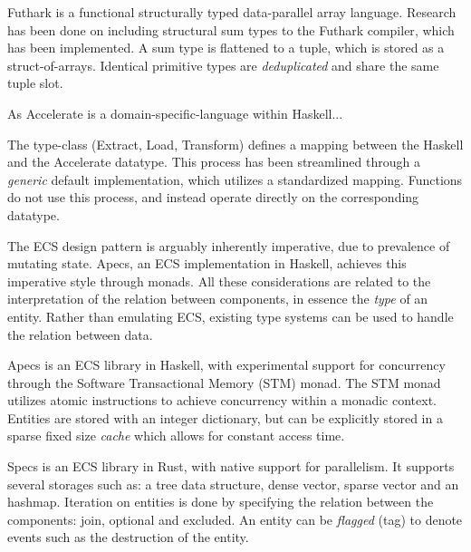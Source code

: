 \documentclass{article}
\newcommand{\type}[1]{\smash{\colorbox{codegray}{\texttt{#1}}}}
\begin{document}
Futhark is a functional structurally typed data-parallel array language.
Research has been done on including structural sum types to the Futhark compiler\cite{futhark-sum-types}, which has been implemented.
A sum type is flattened to a tuple, which is stored as a struct-of-arrays. 
Identical primitive types are {\it deduplicated} and share the same tuple slot.


As Accelerate is a domain-specific-language within Haskell...

The \type{Elt} type-class (Extract, Load, Transform) defines a mapping between the Haskell and the Accelerate datatype.
This process has been streamlined through a {\it generic} default implementation, which utilizes a standardized mapping.
Functions do not use this process, and instead operate directly on the corresponding datatype.

The ECS design pattern is arguably inherently imperative, due to prevalence of mutating state. 
Apecs, an ECS implementation in Haskell, achieves this imperative style through monads\cite{ecs-apecs}.
All these considerations are related to the interpretation of the relation between components, in essence the {\it type} of an entity. 
Rather than emulating ECS, existing type systems can be used to handle the relation between data.

Apecs\cite{ecs-apecs} is an ECS library in Haskell, with experimental support for concurrency through the Software Transactional Memory (STM) monad\cite{STM-monad}.
The STM monad utilizes atomic instructions to achieve concurrency within a monadic context.
Entities are stored with an integer dictionary, but can be explicitly stored in a sparse fixed size {\it cache} which allows for constant access time. 

Specs is an ECS library in Rust\cite{ecs-specs}, with native support for parallelism.
It supports several storages such as: a tree data structure, dense vector, sparse vector and an hashmap.
Iteration on entities is done by specifying the relation between the components: join, optional and excluded.
An entity can be {\it flagged} (tag) to denote events such as the destruction of the entity.
\end{document}
